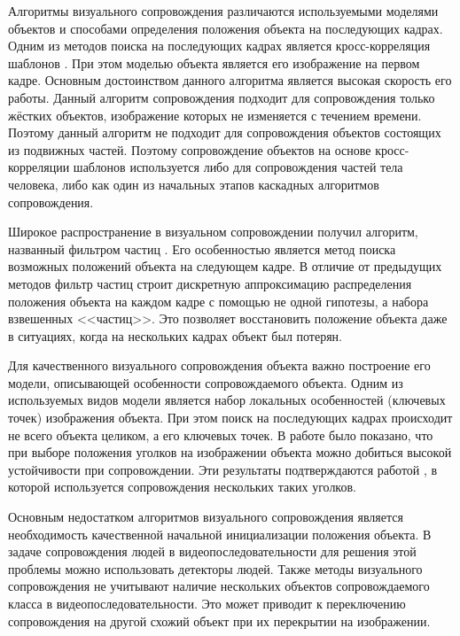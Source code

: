 Алгоритмы визуального сопровождения различаются используемыми моделями объектов и способами определения положения объекта на последующих кадрах. Одним из методов поиска на последующих кадрах является кросс-корреляция шаблонов \cite{freeman1998computer}. При этом моделью объекта является его изображение на первом кадре. Основным достоинством данного алгоритма является высокая скорость его работы. Данный алгоритм сопровождения подходит для сопровождения только жёстких объектов, изображение которых не изменяется с течением времени. Поэтому данный алгоритм не подходит для сопровождения объектов состоящих из подвижных частей. Поэтому сопровождение объектов на основе кросс-корреляции шаблонов используется либо для сопровождения частей тела человека, либо как один из начальных этапов каскадных алгоритмов сопровождения.

Широкое распространение в визуальном сопровождении получил алгоритм, названный фильтром частиц \cite{isard1998condensation}. Его особенностью является метод поиска возможных положений объекта на следующем кадре. В отличие от предыдущих методов фильтр частиц строит дискретную аппроксимацию распределения положения объекта на каждом кадре с помощью не одной гипотезы, а набора взвешенных <<частиц>>. Это позволяет восстановить положение объекта даже в ситуациях, когда на нескольких кадрах объект был потерян.

Для качественного визуального сопровождения объекта важно построение его модели, описывающей особенности сопровождаемого объекта. Одним из используемых видов модели является набор локальных особенностей (ключевых точек) изображения объекта. При этом поиск на последующих кадрах происходит не всего объекта целиком, а его ключевых точек. В работе \cite{shi1994good} было показано, что при выборе положения уголков на изображении объекта можно добиться высокой устойчивости при сопровождении. Эти результаты подтверждаются работой \cite{kolsch2004fast}, в которой используется сопровождения нескольких таких уголков.

Основным недостатком алгоритмов визуального сопровождения является необходимость качественной начальной инициализации положения объекта. В задаче сопровождения людей в видеопоследовательности для решения этой проблемы можно использовать детекторы людей. Также методы визуального сопровождения не учитывают наличие нескольких объектов сопровождаемого класса в видеопоследовательности. Это может приводит к переключению сопровождения на другой схожий объект при их перекрытии на изображении.

